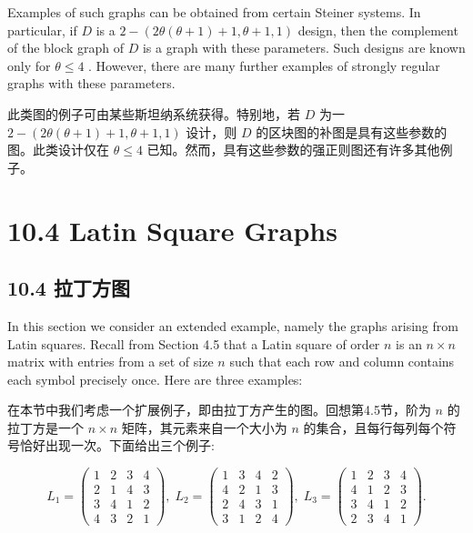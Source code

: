 \documentclass[10pt]{article}
\begin{document}
Examples of such graphs can be obtained from certain Steiner systems. In particular, if \(D\) is a \(2 - \left( {{2\theta }\left( {\theta  + 1}\right)  + 1,\theta  + 1,1}\right)\) design, then the complement of the block graph of \(D\) is a graph with these parameters. Such designs are known only for \(\theta  \leq  4\) . However, there are many further examples of strongly regular graphs with these parameters.

\begin{tcolorbox}\relax
此类图的例子可由某些斯坦纳系统获得。特别地，若 \(D\) 为一 \(2 - \left( {{2\theta }\left( {\theta  + 1}\right)  + 1,\theta  + 1,1}\right)\) 设计，则 \(D\) 的区块图的补图是具有这些参数的图。此类设计仅在 \(\theta  \leq  4\) 已知。然而，具有这些参数的强正则图还有许多其他例子。
\end{tcolorbox}

\section*{10.4 Latin Square Graphs}

\begin{tcolorbox}\relax
\section*{10.4 拉丁方图}
\end{tcolorbox}

In this section we consider an extended example, namely the graphs arising from Latin squares. Recall from Section 4.5 that a Latin square of order \(n\) is an \(n \times  n\) matrix with entries from a set of size \(n\) such that each row and column contains each symbol precisely once. Here are three examples:

\begin{tcolorbox}\relax
在本节中我们考虑一个扩展例子，即由拉丁方产生的图。回想第4.5节，阶为 \(n\) 的拉丁方是一个 \(n \times  n\) 矩阵，其元素来自一个大小为 \(n\) 的集合，且每行每列每个符号恰好出现一次。下面给出三个例子:
\end{tcolorbox}

\[
{L}_{1} = \left( \begin{array}{llll} 1 & 2 & 3 & 4 \\  2 & 1 & 4 & 3 \\  3 & 4 & 1 & 2 \\  4 & 3 & 2 & 1 \end{array}\right) ,\;{L}_{2} = \left( \begin{array}{llll} 1 & 3 & 4 & 2 \\  4 & 2 & 1 & 3 \\  2 & 4 & 3 & 1 \\  3 & 1 & 2 & 4 \end{array}\right) ,\;{L}_{3} = \left( \begin{array}{llll} 1 & 2 & 3 & 4 \\  4 & 1 & 2 & 3 \\  3 & 4 & 1 & 2 \\  2 & 3 & 4 & 1 \end{array}\right) .
\]
\end{document}
